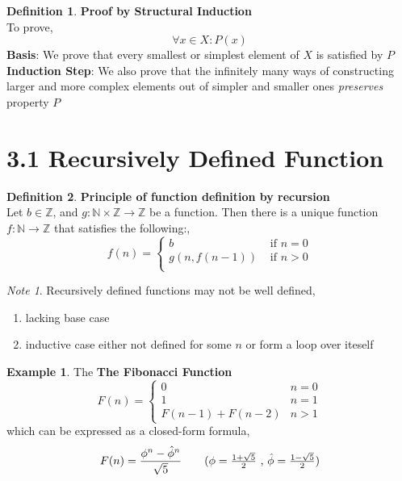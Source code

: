\documentclass[11pt]{article}
\theoremstyle{plain}%
\theoremstyle{definition}
\newtheorem{defn}{Definition}
\newtheorem{exmp}{Example}[defn]
\theoremstyle{remark}
\newtheorem*{note}{Note}
\newcommand{\N}{\mathbb{N}}
\begin{document}
\begin{defn}
  \label{proof by structural induction}
  \textbf{Proof by Structural Induction}\\ To prove,
  \[
    \forall x\in X: P(x) \tag{ where $X$ is defined recursively}
  \]
  \textbf{Basis}: We prove that every smallest or simplest element of $X$ is satisfied by $P$\\
  \textbf{Induction Step}: We also prove that the infinitely many ways of constructing larger and more complex elements out of simpler and smaller ones \textit{preserves} property $P$
\end{defn}

\section*{3.1 Recursively Defined Function}

\begin{defn}
  \label{Principle of function definition by recursion}
  \textbf{Principle of function definition by recursion}\\
  Let $b\in\mathbb{Z}$, and $g:\N \times \mathbb{Z} \to \mathbb{Z}$ be a function. Then there is a unique function $f:\N \to \mathbb{Z}$ that satisfies the following:,
  \[
    f(n)=
    \begin{cases}
      b & \text{ if } n=0\\
      g(n, f(n-1)) & \text{ if } n>0 \\
    \end{cases}
  \]
  \begin{note}
    Recursively defined functions may not be well defined,
    \begin{enumerate}
      \item lacking base case
      \item inductive case either not defined for some $n$ or form a loop over iteself
    \end{enumerate}
  \end{note}

  \begin{exmp}
    The \textbf{The Fibonacci Function}
    \label{Fibonacci function}
    \[
      F(n) =
      \begin{cases}
        0 & n=0\\
        1 & n=1\\
        F(n-1) + F(n-2) & n>1
      \end{cases}
    \]
    which can be expressed as a closed-form formula,
    \[
      F(n) = \frac{\phi^n - \hat\phi^n}{\sqrt{5}} \tag{$\phi = \frac{1+\sqrt{5}}{2} \text{ , } \hat\phi = \frac{1-\sqrt{5}}{2} $}
    \]
  \end{exmp}
\end{defn}
\end{document}
